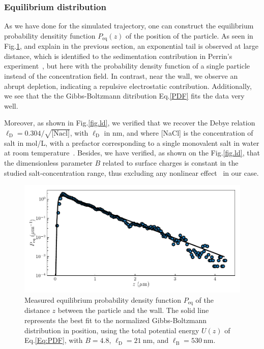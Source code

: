 \subsubsection{Equilibrium distribution}

As we have done for the simulated trajectory, one can construct the equilibrium probability densitity function $P_\mathrm{eq}(z)$ of the position of the particle. As seen in Fig.\ref{fig.pdf_exp}, and explain in the previous section, an exponential tail is observed at large distance, which is identified to the sedimentation contribution in Perrin's experiment~\cite{perrin_les_2014}, but here with the probability density function of a single particle instead of the concentration field. In contrast, near the wall, we observe an abrupt depletion, indicating a repulsive electrostatic contribution. Additionally, we see that the the Gibbs-Boltzmann ditribution Eq.\ref{PDF} fits the data very well.



 Moreover, as shown in Fig.\ref{fig.ld}, we verified that we recover the Debye relation $\ell_{\mathrm{D}}=0.304/\sqrt{\textrm{[Nacl]}}$, with $\ell_{\mathrm{D}}$ in nm, and where [NaCl] is the concentration of salt in mol/L, with a prefactor corresponding to a single monovalent salt in water at room temperature~\cite{israelachvili_intermolecular_2015}. Besides, we have verified, as shown on the Fig.\ref{fig.ld}, that the dimensionless parameter $B$ related to surface charges is constant in the studied salt-concentration range, thus excluding any nonlinear effect~\cite{wang_measurement_2011,oberholzer_grand_1997} in our case. 
 
 \begin{figure}[h!]
 	\centering
 	\includegraphics{02_body/chapter3/images/trajctory_analysis/pdf_exp.pdf}
 	\caption{Measured equilibrium probability density function $P_{\textrm{eq}}$ of the distance $z$ between the particle and the wall. The solid line represents the best fit to the normalized Gibbs-Boltzmann distribution in position, using the total potential energy $U(z)$ of Eq.\ref{Eq:PDF}, with $B = 4.8$, $\ell_\mathrm{D} = 21 ~ \mathrm{nm}$, and $\ell_\mathrm{B} = 530~ \mathrm{nm}$.}
 	\label{fig.pdf_exp}
 \end{figure}


